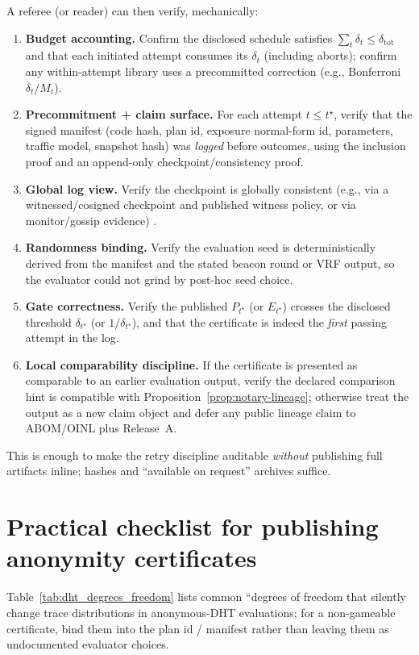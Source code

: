 \documentclass[11pt]{article}
\begin{document}
A referee (or reader) can then verify, mechanically:
\begin{enumerate}
\item \textbf{Budget accounting.} Confirm the disclosed schedule satisfies $\sum_t \delta_t \le \delta_{\text{tot}}$ and that each initiated attempt consumes its $\delta_t$
(including aborts); confirm any within-attempt library uses a precommitted correction (e.g., Bonferroni $\delta_t/M_t$).
\item \textbf{Precommitment + claim surface.} For each attempt $t\le t^\star$, verify that the signed manifest (code hash, plan id, exposure normal-form id, parameters, traffic model, snapshot hash) was \emph{logged} before outcomes,
using the inclusion proof and an append-only checkpoint/consistency proof.
\item \textbf{Global log view.} Verify the checkpoint is globally consistent (e.g., via a witnessed/cosigned checkpoint and published witness policy, or via monitor/gossip evidence) \cite{c2sp_tlog_witness,c2sp_tlog_cosignature}.
\item \textbf{Randomness binding.} Verify the evaluation seed is deterministically derived from the manifest and the stated beacon round or VRF output, so the evaluator could not grind by post-hoc seed choice.
\item \textbf{Gate correctness.} Verify the published $P_{t^\star}$ (or $E_{t^\star}$) crosses the disclosed threshold $\delta_{t^\star}$ (or $1/\delta_{t^\star}$), and that the certificate is indeed the \emph{first} passing attempt in the log.
\item \textbf{Local comparability discipline.} If the certificate is presented as comparable to an earlier evaluation output, verify the declared comparison hint is compatible with Proposition~\ref{prop:notary-lineage}; otherwise treat the output as a new claim object and defer any public lineage claim to ABOM/OINL plus Release~A.
\end{enumerate}
This is enough to make the retry discipline auditable \emph{without} publishing full artifacts inline; hashes and ``available on request'' archives suffice.






\section{Practical checklist for publishing anonymity certificates}
\noindent Table~\ref{tab:dht_degrees_freedom} lists common ``degrees of freedom that silently change trace distributions in anonymous-DHT evaluations;
for a non-gameable certificate, bind them into the plan id / manifest rather than leaving them as undocumented evaluator choices.
\end{document}
